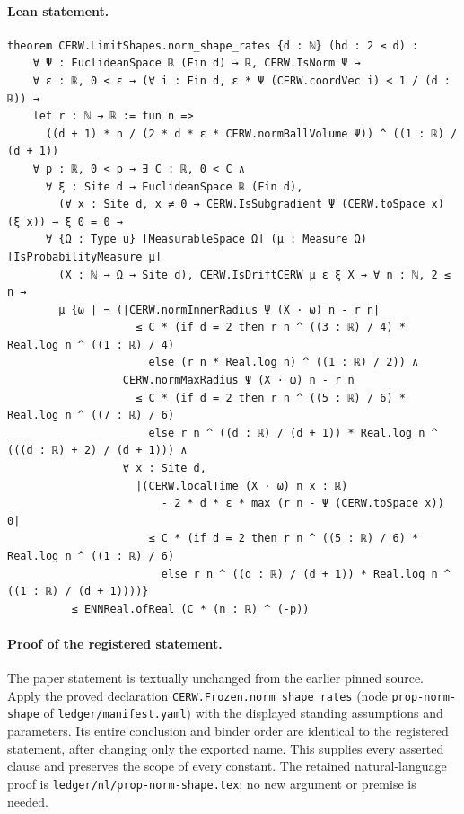 \paragraph{Lean statement.}
\begin{verbatim}
theorem CERW.LimitShapes.norm_shape_rates {d : ℕ} (hd : 2 ≤ d) :
    ∀ Ψ : EuclideanSpace ℝ (Fin d) → ℝ, CERW.IsNorm Ψ →
    ∀ ε : ℝ, 0 < ε → (∀ i : Fin d, ε * Ψ (CERW.coordVec i) < 1 / (d : ℝ)) →
    let r : ℕ → ℝ := fun n =>
      ((d + 1) * n / (2 * d * ε * CERW.normBallVolume Ψ)) ^ ((1 : ℝ) / (d + 1))
    ∀ p : ℝ, 0 < p → ∃ C : ℝ, 0 < C ∧
      ∀ ξ : Site d → EuclideanSpace ℝ (Fin d),
        (∀ x : Site d, x ≠ 0 → CERW.IsSubgradient Ψ (CERW.toSpace x) (ξ x)) → ξ 0 = 0 →
      ∀ {Ω : Type u} [MeasurableSpace Ω] (μ : Measure Ω) [IsProbabilityMeasure μ]
        (X : ℕ → Ω → Site d), CERW.IsDriftCERW μ ε ξ X → ∀ n : ℕ, 2 ≤ n →
        μ {ω | ¬ (|CERW.normInnerRadius Ψ (X · ω) n - r n|
                    ≤ C * (if d = 2 then r n ^ ((3 : ℝ) / 4) * Real.log n ^ ((1 : ℝ) / 4)
                      else (r n * Real.log n) ^ ((1 : ℝ) / 2)) ∧
                  CERW.normMaxRadius Ψ (X · ω) n - r n
                    ≤ C * (if d = 2 then r n ^ ((5 : ℝ) / 6) * Real.log n ^ ((7 : ℝ) / 6)
                      else r n ^ ((d : ℝ) / (d + 1)) * Real.log n ^ (((d : ℝ) + 2) / (d + 1))) ∧
                  ∀ x : Site d,
                    |(CERW.localTime (X · ω) n x : ℝ)
                        - 2 * d * ε * max (r n - Ψ (CERW.toSpace x)) 0|
                      ≤ C * (if d = 2 then r n ^ ((5 : ℝ) / 6) * Real.log n ^ ((1 : ℝ) / 6)
                        else r n ^ ((d : ℝ) / (d + 1)) * Real.log n ^ ((1 : ℝ) / (d + 1))))}
          ≤ ENNReal.ofReal (C * (n : ℝ) ^ (-p))
\end{verbatim}
\paragraph{Proof of the registered statement.}
The paper statement is textually unchanged from the earlier pinned source.
Apply the proved declaration \texttt{CERW.Frozen.norm\_shape\_rates}
(node \texttt{prop-norm-shape} of \texttt{ledger/manifest.yaml}) with the displayed
standing assumptions and parameters. Its entire conclusion and binder order
are identical to the registered statement, after changing only the exported
name. This supplies every asserted clause and preserves the scope of every
constant. The retained natural-language proof is
\texttt{ledger/nl/prop-norm-shape.tex}; no new argument or premise is needed.
